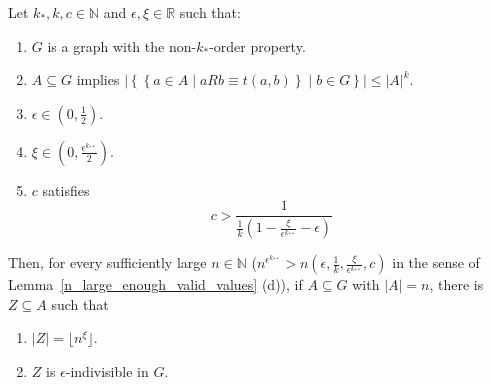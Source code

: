     \lemma[Claim 4.21]\label{many_values_to_equitative_partition_with_bound_exceptional_pairs}
        Let $k_*, k, c \in \mathbb{N}$ and $\epsilon, \xi \in \mathbb{R}$ such that:
        \begin{enumerate}
            \item\label{itm:4.21.1} $G$ is a graph with the non-$k_*$-order property.
            \item\label{itm:4.21.2} $A \subseteq G$ implies $|\left\{ \left\{ a \in A \mid a R b \equiv t(a,b) \right\} \mid b \in G \right\}|
                \leq |A|^k$.
            \item\label{itm:4.21.3} $\epsilon \in \left(0, \frac{1}{2}\right)$.
            \item\label{itm:4.21.4} $\xi \in \left(0, \frac{\epsilon^{k_{**}}}{2} \right)$.
            \item\label{itm:4.21.5} $c$ satisfies \[
                c > \frac{1}{\frac{1}{k} (1 - \frac{\xi}{\epsilon^{k_{**}}} - \epsilon)}
            \]
        \end{enumerate}
        Then, for every sufficiently large $n \in \mathbb{N}$ ($n^{\epsilon^{k_{**}}} > n\left( \epsilon, \frac{1}{k},
        \frac{\xi}{\epsilon^{k_{**}}}, c \right)$ in the sense of Lemma~\ref{n_large_enough_valid_values} (d)), if
        $A \subseteq G$ with $|A| = n$, there is $Z \subseteq A$ such that
        \begin{enumerate}[label=(\alph*), ref=\alph*]
            \item\label{itm:4.21.a} $|Z| = \lfloor n^\xi \rfloor$.
            \item\label{itm:4.21.b} $Z$ is $\epsilon$-indivisible in $G$.
        \end{enumerate}
